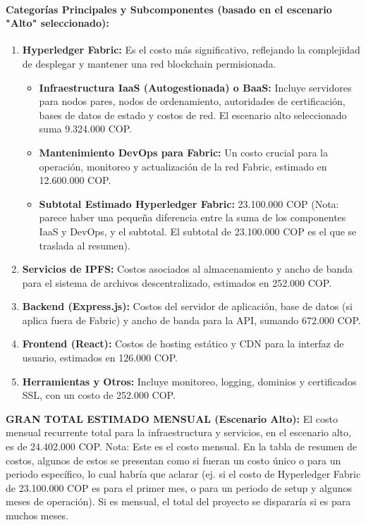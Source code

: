 \paragraph{Categorías Principales y Subcomponentes (basado en el escenario "Alto" seleccionado): }

\begin{enumerate}
\item \textbf{Hyperledger Fabric:} Es el costo más significativo, reflejando la complejidad de desplegar y mantener una red blockchain permisionada. 

\begin{itemize}
\item \textbf{Infraestructura IaaS (Autogestionada) o BaaS:} Incluye servidores para nodos pares, nodos de ordenamiento, autoridades de certificación, bases de datos de estado y costos de red. El escenario alto seleccionado suma 9.324.000 COP. 

\item \textbf{Mantenimiento DevOps para Fabric:} Un costo crucial para la operación, monitoreo y actualización de la red Fabric, estimado en 12.600.000 COP. 

\item\textbf{Subtotal Estimado Hyperledger Fabric:} 23.100.000 COP (Nota: parece haber una pequeña diferencia entre la suma de los componentes IaaS y DevOps, y el subtotal. El subtotal de 23.100.000 COP es el que se traslada al resumen). 
\end{itemize}
\item \textbf{Servicios de IPFS:} Costos asociados al almacenamiento y ancho de banda para el 		sistema de archivos descentralizado, estimados en 252.000 COP. 

\item \textbf{Backend (Express.js):} Costos del servidor de aplicación, base de datos (si aplica fuera de Fabric) y ancho de banda para la API, sumando 672.000 COP. 

\item \textbf{Frontend (React):} Costos de hosting estático y CDN para la interfaz de usuario, estimados en 126.000 COP. 

\item \textbf{Herramientas y Otros:} Incluye monitoreo, logging, dominios y certificados SSL, con un costo de 252.000 COP. 
\end{enumerate}
 

\textbf{GRAN TOTAL ESTIMADO MENSUAL (Escenario Alto):} El costo mensual recurrente total para la infraestructura y servicios, en el escenario alto, es de 24.402.000 COP. Nota: Este es el costo mensual. En la tabla de resumen de costos, algunos de estos se presentan como si fueran un costo único o para un periodo específico, lo cual habría que aclarar (ej. si el costo de Hyperledger Fabric de 23.100.000 COP es para el primer mes, o para un periodo de setup y algunos meses de operación). Si es mensual, el total del proyecto se dispararía si es para muchos meses. 

